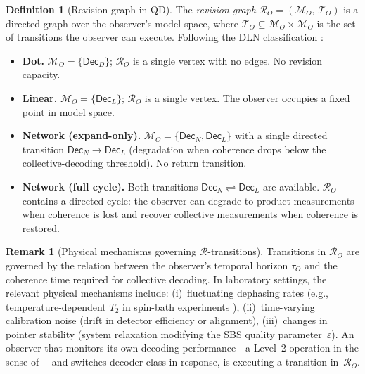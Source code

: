 \documentclass[11pt]{article}
\newcommand{\1}{\mathbf{1}}
\theoremstyle{definition}
\newtheorem{definition}{Definition}
\newtheorem{remark}{Remark}
\theoremstyle{plain}
\begin{document}
\begin{definition}[Revision graph in QD]
\label{def:revision-qd}
The \emph{revision graph}
$\mathcal{R}_O = (\mathcal{M}_O,\,\mathcal{T}_O)$
is a directed graph over the observer's model space, where
$\mathcal{T}_O \subseteq \mathcal{M}_O\times\mathcal{M}_O$ is the set
of transitions the observer can execute.
Following the DLN classification
\citep[Sec.~2.3]{WuDLNCompression2026preprint}:
%
\begin{itemize}
\item \textbf{Dot.}
  $\mathcal{M}_O=\{\mathsf{Dec}_D\}$;
  $\mathcal{R}_O$ is a single vertex with no edges.
  No revision capacity.

\item \textbf{Linear.}
  $\mathcal{M}_O=\{\mathsf{Dec}_L\}$;
  $\mathcal{R}_O$ is a single vertex.
  The observer occupies a fixed point in model space.

\item \textbf{Network (expand-only).}
  $\mathcal{M}_O=\{\mathsf{Dec}_N,\mathsf{Dec}_L\}$ with a single
  directed transition
  $\mathsf{Dec}_N\to\mathsf{Dec}_L$
  (degradation when coherence drops below the collective-decoding
  threshold).
  No return transition.

\item \textbf{Network (full cycle).}
  Both transitions
  $\mathsf{Dec}_N \rightleftharpoons \mathsf{Dec}_L$
  are available.
  $\mathcal{R}_O$ contains a directed cycle: the observer can degrade to
  product measurements when coherence is lost and recover collective
  measurements when coherence is restored.
\end{itemize}
\end{definition}


\begin{remark}[Physical mechanisms governing $\mathcal{R}$-transitions]
\label{rem:transition-physics}
Transitions in $\mathcal{R}_O$ are governed by the relation between the
observer's temporal horizon $\tau_O$ and the coherence time required for
collective decoding.
In laboratory settings, the relevant physical mechanisms include:
(i)~fluctuating dephasing rates (e.g., temperature-dependent $T_2$ in
spin-bath experiments \citep{Schlosshauer2007}),
(ii)~time-varying calibration noise (drift in detector efficiency or
alignment),
(iii)~changes in pointer stability (system relaxation modifying the SBS
quality parameter~$\varepsilon$).
An observer that monitors its own decoding performance---a Level~2
operation in the sense of
\citep[Sec.~2.3]{WuDLNCompression2026preprint}---and switches decoder
class in response, is executing a transition in~$\mathcal{R}_O$.
\end{remark}
\end{document}
